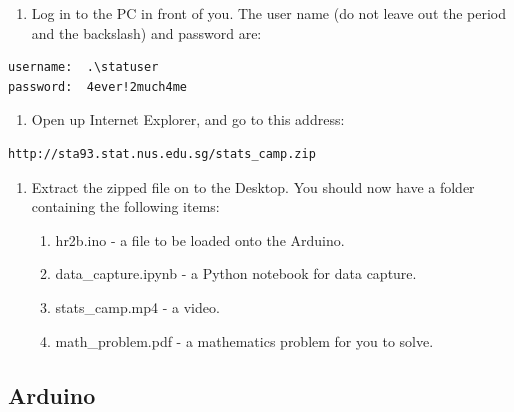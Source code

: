 \documentclass[11pt]{article}
\providecommand{\tightlist}{%
  \setlength{\itemsep}{0pt}\setlength{\parskip}{0pt}}
\begin{document}
\begin{enumerate}
\def\labelenumi{\arabic{enumi}.}
\tightlist
\item
  Log in to the PC in front of you. The user name (do not leave out the
  period and the backslash) and password are:
\end{enumerate}

\begin{verbatim}
username:  .\statuser
password:  4ever!2much4me
\end{verbatim}

\begin{enumerate}
\def\labelenumi{\arabic{enumi}.}
\setcounter{enumi}{1}
\tightlist
\item
  Open up Internet Explorer, and go to this address:
\end{enumerate}

\begin{verbatim}
http://sta93.stat.nus.edu.sg/stats_camp.zip
\end{verbatim}

\begin{enumerate}
\def\labelenumi{\arabic{enumi}.}
\setcounter{enumi}{2}
\tightlist
\item
  Extract the zipped file on to the Desktop. You should now have a
  folder containing the following items:

  \begin{enumerate}
  \def\labelenumii{\arabic{enumii}.}
  \tightlist
  \item
    hr2b.ino - a file to be loaded onto the Arduino.
  \item
    data\_capture.ipynb - a Python notebook for data capture.
  \item
    stats\_camp.mp4 - a video.
  \item
    math\_problem.pdf - a mathematics problem for you to solve.
  \end{enumerate}
\end{enumerate}

\hypertarget{arduino}{%
\subsection{Arduino}\label{arduino}}
\end{document}
